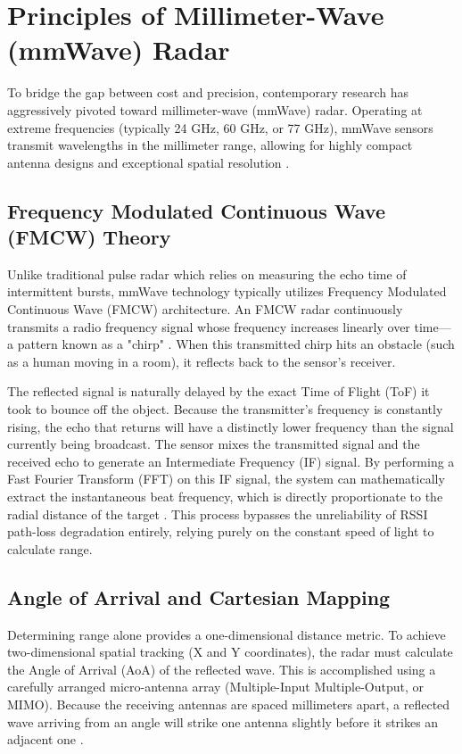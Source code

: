 \section{Principles of Millimeter-Wave (mmWave) Radar}

To bridge the gap between cost and precision, contemporary research has aggressively pivoted toward millimeter-wave (mmWave) radar. Operating at extreme frequencies (typically 24 GHz, 60 GHz, or 77 GHz), mmWave sensors transmit wavelengths in the millimeter range, allowing for highly compact antenna designs and exceptional spatial resolution \cite{wei2014key}.

\subsection{Frequency Modulated Continuous Wave (FMCW) Theory}

Unlike traditional pulse radar which relies on measuring the echo time of intermittent bursts, mmWave technology typically utilizes Frequency Modulated Continuous Wave (FMCW) architecture. An FMCW radar continuously transmits a radio frequency signal whose frequency increases linearly over time—a pattern known as a "chirp" \cite{patole2017automotive}. When this transmitted chirp hits an obstacle (such as a human moving in a room), it reflects back to the sensor's receiver. 

The reflected signal is naturally delayed by the exact Time of Flight (ToF) it took to bounce off the object. Because the transmitter's frequency is constantly rising, the echo that returns will have a distinctly lower frequency than the signal currently being broadcast. The sensor mixes the transmitted signal and the received echo to generate an Intermediate Frequency (IF) signal. By performing a Fast Fourier Transform (FFT) on this IF signal, the system can mathematically extract the instantaneous beat frequency, which is directly proportionate to the radial distance of the target \cite{hasch2012millimeter}. This process bypasses the unreliability of RSSI path-loss degradation entirely, relying purely on the constant speed of light to calculate range.

\subsection{Angle of Arrival and Cartesian Mapping}

Determining range alone provides a one-dimensional distance metric. To achieve two-dimensional spatial tracking (X and Y coordinates), the radar must calculate the Angle of Arrival (AoA) of the reflected wave. This is accomplished using a carefully arranged micro-antenna array (Multiple-Input Multiple-Output, or MIMO). Because the receiving antennas are spaced millimeters apart, a reflected wave arriving from an angle will strike one antenna slightly before it strikes an adjacent one \cite{sun2020wifi}. 

